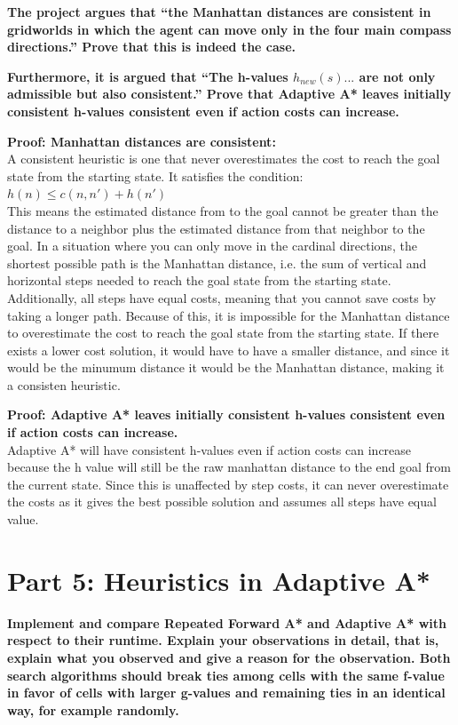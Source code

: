 \documentclass[12pt]{article}
\begin{document}
\textbf{The project argues that “the Manhattan distances are consistent in gridworlds in which the agent can move only in the four main compass directions.” Prove that this is indeed the case.}

\textbf{Furthermore, it is argued that “The h-values $h_{new}(s) ...$ are not only admissible but also consistent.” Prove that Adaptive A* leaves initially consistent h-values consistent even if action costs can increase.}

\textbf{Proof: Manhattan distances are consistent:\\}
A consistent heuristic is one that never overestimates the cost to reach the goal state from the starting state. It satisfies the condition:\\
$h(n)\leq c(n,n')+h(n')$\\This means the estimated distance from 
 to the goal cannot be greater than the distance to a neighbor plus the estimated distance from that neighbor to the goal.
 In a situation where you can only move in the cardinal directions, the shortest possible path is the Manhattan distance, i.e. the sum of vertical and horizontal steps needed to reach the goal state from the starting state. Additionally, all steps have equal costs, meaning that you cannot save costs by taking a longer path. Because of this, it is impossible for the Manhattan distance to overestimate the cost to reach the goal state from the starting state. If there exists a lower cost solution, it would have to have a smaller distance, and since it would be the minumum distance it would be the Manhattan distance, making it a consisten heuristic.
 
 \textbf{Proof: Adaptive A* leaves initially consistent h-values consistent even if action costs can increase.\\}
 Adaptive A* will have consistent h-values even if action costs can increase because the h value will still be the raw manhattan distance to the end goal from the current state. Since this is unaffected by step costs, it can never overestimate the costs as it gives the best possible solution and assumes all steps have equal value.
 


\section{Part 5: Heuristics in Adaptive A*}


\textbf{Implement and compare Repeated Forward A* and Adaptive A*
with respect to their runtime. Explain your observations in detail, that is, explain what you observed and give a reason for
the observation. Both search algorithms should break ties among cells with the same f-value in favor of cells with larger
g-values and remaining ties in an identical way, for example randomly.\\}
\end{document}
